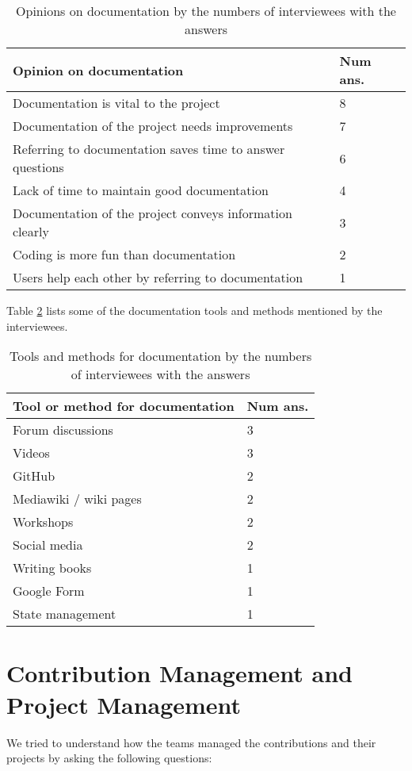 \begin{table}[H]
\centering
\begin{tabular}{ll}
\hline
Opinion on documentation & Num ans. \\ \hline
Documentation is vital to the project& 8 \\
Documentation of the project needs improvements & 7 \\
Referring to documentation saves time to answer questions & 6 \\
Lack of time to maintain good documentation & 4 \\
Documentation of the project conveys information clearly & 3 \\
Coding is more fun than documentation & 2 \\
Users help each other by referring to documentation & 1 \\ \hline
\end{tabular}
\caption{\label{tab_opinion_doc}Opinions on documentation by the numbers of interviewees with the answers}
\end{table}

Table \ref{tab_doc_tools} lists some of the documentation tools and methods mentioned by the interviewees.

\begin{table}[H]
\centering
\begin{tabular}{ll}
\hline
Tool or method for documentation & Num ans. \\ \hline
Forum discussions & 3 \\
Videos & 3 \\
GitHub & 2 \\
Mediawiki / wiki pages & 2 \\
Workshops & 2 \\
Social media & 2 \\
Writing books & 1 \\
Google Form & 1 \\
State management & 1 \\ \hline
\end{tabular}
\caption{\label{tab_doc_tools}Tools and methods for documentation by the numbers of interviewees with the answers}
\end{table}

\section{Contribution Management and Project Management}
\label{sec_contribution_pm}
We tried to understand how the teams managed the contributions and their projects by asking the following questions:

